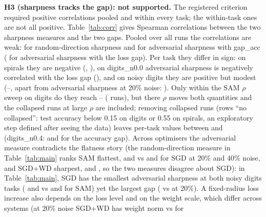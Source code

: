 \textbf{H3 (sharpness tracks the gap): not supported.} The registered criterion required positive correlations pooled and within every task; the within-task ones are not all positive. Table~\ref{tab:corr} gives Spearman correlations between the two sharpness measures and the two gaps. Pooled over all  runs the correlations are weak:  for random-direction sharpness and  for adversarial sharpness with gap\_acc ( for adversarial sharpness with the loss gap). Per task they differ in sign: on spirals they are negative (, ), on digits\_n0.0 adversarial sharpness is negatively correlated with the loss gap (), and on noisy digits they are positive but modest (--, apart from adversarial sharpness at 20\% noise: ). Only within the SAM $\rho$ sweep on digits do they reach -- ( runs), but there $\rho$ moves both quantities and the collapsed runs at large $\rho$ are included; removing collapsed runs (rows ``no collapsed'': test accuracy below 0.15 on digits or 0.55 on spirals, an exploratory step defined after seeing the data) leaves per-task values between  and  (digits\_n0.4:  and  for the accuracy gap). Across optimisers the adversarial measure contradicts the flatness story (the random-direction measure in Table~\ref{tab:main} ranks SAM flattest,  and  vs  and  for SGD at 20\% and 40\% noise, and SGD+WD sharpest,  and , so the two measures disagree about SGD): in Table~\ref{tab:main}, SGD has the smallest adversarial sharpness at both noisy digits tasks ( and  vs  and  for SAM) yet the largest gap ( vs  at 20\%). A fixed-radius loss increase also depends on the loss level and on the weight scale, which differ across systems (at 20\% noise SGD+WD has weight norm  vs  for 